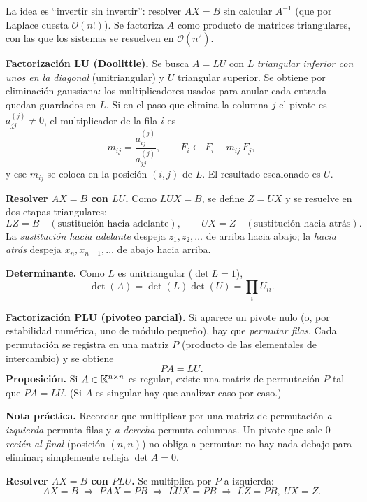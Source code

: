 \begin{teoria}
La idea es ``invertir sin invertir'': resolver $AX = B$ sin calcular $A^{-1}$ (que por Laplace cuesta $\mathcal{O}(n!)$). Se factoriza $A$ como producto de matrices triangulares, con las que los sistemas se resuelven en $\mathcal{O}(n^2)$.

\textbf{Factorización LU (Doolittle).} Se busca $A = LU$ con $L$ \emph{triangular inferior con unos en la diagonal} (unitriangular) y $U$ triangular superior. Se obtiene por eliminación gaussiana: los multiplicadores usados para anular cada entrada quedan guardados en $L$. Si en el paso que elimina la columna $j$ el pivote es $a^{(j)}_{jj} \neq 0$, el multiplicador de la fila $i$ es
\[
m_{ij} = \frac{a^{(j)}_{ij}}{a^{(j)}_{jj}}, \qquad F_i \leftarrow F_i - m_{ij}\, F_j,
\]
y ese $m_{ij}$ se coloca en la posición $(i,j)$ de $L$. El resultado escalonado es $U$.

\textbf{Resolver $AX = B$ con $LU$.} Como $LUX = B$, se define $Z = UX$ y se resuelve en dos etapas triangulares:
\[
LZ = B \quad(\text{sustitución hacia adelante}), \qquad UX = Z \quad(\text{sustitución hacia atrás}).
\]
La \emph{sustitución hacia adelante} despeja $z_1, z_2, \dots$ de arriba hacia abajo; la \emph{hacia atrás} despeja $x_n, x_{n-1}, \dots$ de abajo hacia arriba.

\textbf{Determinante.} Como $L$ es unitriangular ($\det L = 1$),
\[
\det(A) = \det(L)\det(U) = \prod_i U_{ii}.
\]

\textbf{Factorización PLU (pivoteo parcial).} Si aparece un pivote nulo (o, por estabilidad numérica, uno de módulo pequeño), hay que \emph{permutar filas}. Cada permutación se registra en una matriz $P$ (producto de las elementales de intercambio) y se obtiene
\[
PA = LU.
\]
\textbf{Proposición.} Si $A \in \mathbb{K}^{n\times n}$ es regular, existe una matriz de permutación $P$ tal que $PA = LU$. (Si $A$ es singular hay que analizar caso por caso.)

\textbf{Nota práctica.} Recordar que multiplicar por una matriz de permutación \emph{a izquierda} permuta filas y \emph{a derecha} permuta columnas. Un pivote que sale $0$ \emph{recién al final} (posición $(n,n)$) no obliga a permutar: no hay nada debajo para eliminar; simplemente refleja $\det A = 0$.

\textbf{Resolver $AX = B$ con $PLU$.} Se multiplica por $P$ a izquierda:
\[
AX = B \;\Rightarrow\; PAX = PB \;\Rightarrow\; LUX = PB \;\Rightarrow\; LZ = PB,\ UX = Z.
\]
\end{teoria}

